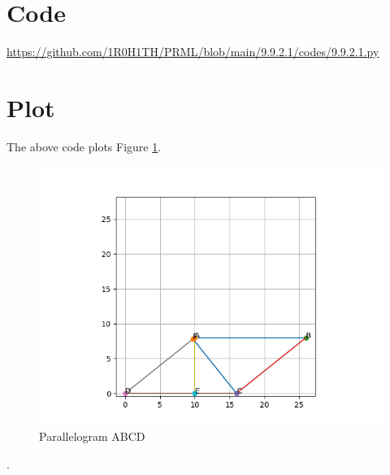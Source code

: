 \documentclass[letterpaper,12pt]{article}
\begin{document}
\clearpage

\section{Code}
\url{https://github.com/1R0H1TH/PRML/blob/main/9.9.2.1/codes/9.9.2.1.py}

\section{Plot}
The above code plots Figure \ref{fig:fig2}.
\begin{figure}[!ht]
\centering
\includegraphics[width=0.75\columnwidth]{figs/Figure_1.png}
\caption{Parallelogram ABCD}
\label{fig:fig2}
\end{figure}.
\end{document}
